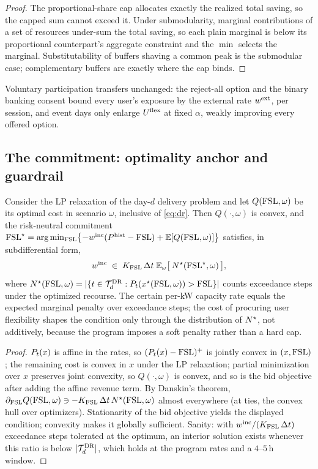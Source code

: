 \begin{proof}
The proportional-share cap allocates exactly the realized total saving,
so the capped sum cannot exceed it. Under submodularity, marginal
contributions of a set of resources under-sum the total saving, so
each plain marginal is below its proportional counterpart's aggregate
constraint and the $\min$ selects the marginal. Substitutability of
buffers shaving a common peak is the submodular case; complementary
buffers are exactly where the cap binds.
\end{proof}

Voluntary participation transfers unchanged: the reject-all option and
the binary banking consent bound every user's exposure by the external
rate $w^{\mathrm{ext}}$, per session, and event days only enlarge $U^{\mathrm{flex}}$ at
fixed $\alpha$, weakly improving every offered option.

\subsection{The commitment: optimality anchor and guardrail}

\begin{proposition}\label{prop:newsvendor}
Consider the LP relaxation of the day-$d$ delivery problem and let
$Q(\mathrm{FSL}, \omega)$ be its optimal cost in scenario $\omega$, inclusive
of \eqref{eq:dr}. Then $Q(\cdot, \omega)$ is convex, and the
risk-neutral commitment $\mathrm{FSL}^{\star} = \arg\min_{\mathrm{FSL}}
\bigl\{-w^{\mathrm{inc}}(P^{\mathrm{hist}} - \mathrm{FSL}) + \mathbb{E}[Q(\mathrm{FSL},\omega)]\bigr\}$
satisfies, in subdifferential form,
\[
w^{\mathrm{inc}} \;\in\; K_{\mathrm{FSL}}\,\Delta t\; \mathbb{E}_{\omega}\bigl[\,
N^{\star}(\mathrm{FSL}^{\star}, \omega)\,\bigr],
\]
where $N^{\star}(\mathrm{FSL},\omega) = |\{t \in \mathcal{T}^{\mathrm{DR}}_{d} :
P_{t}(x^{\star}(\mathrm{FSL},\omega)) > \mathrm{FSL}\}|$ counts exceedance steps
under the optimized recourse. The certain per-kW capacity rate equals
the expected marginal penalty over exceedance steps; the cost of
procuring user flexibility shapes the condition only through the
distribution of $N^{\star}$, not additively, because the program imposes a
soft penalty rather than a hard cap.
\end{proposition}

\begin{proof}
$P_{t}(x)$ is affine in the rates, so $(P_{t}(x) - \mathrm{FSL})^{+}$ is
jointly convex in $(x, \mathrm{FSL})$; the remaining cost is convex in $x$
under the LP relaxation; partial minimization over $x$ preserves joint
convexity, so $Q(\cdot,\omega)$ is convex, and so is the bid objective
after adding the affine revenue term. By Danskin's theorem,
$\partial_{\mathrm{FSL}} Q(\mathrm{FSL},\omega) \ni -K_{\mathrm{FSL}}\,\Delta t\,N^{\star}(\mathrm{FSL},\omega)$
almost everywhere (at ties, the convex hull over optimizers).
Stationarity of the bid objective yields the displayed condition;
convexity makes it globally sufficient. Sanity: with
$w^{\mathrm{inc}}/(K_{\mathrm{FSL}}\,\Delta t)$ exceedance steps tolerated at the optimum, an
interior solution exists whenever this ratio is below
$|\mathcal{T}^{\mathrm{DR}}_{d}|$, which holds at the program rates and a $4$--$5$\,h
window.
\end{proof}

